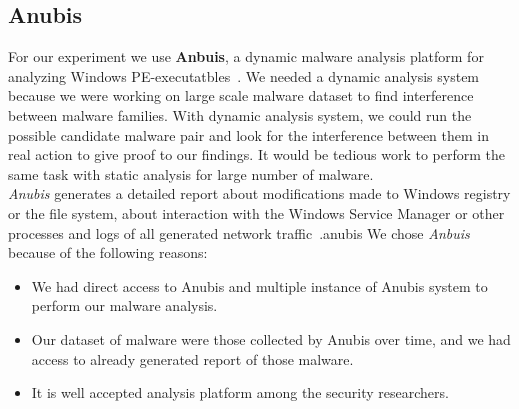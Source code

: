 \subsection{Anubis}
\label{sub:Anubis}
For our experiment we use \textbf{Anbuis}, a dynamic malware analysis platform for analyzing Windows PE-executatbles~\cite[]{anubis}.
We needed a dynamic analysis system because we were working on large scale malware dataset to find interference between malware families.
With dynamic analysis system, we could run the possible candidate malware pair and look for the interference between them in real action to give proof to our findings.
It would be tedious work to perform the same task with static analysis for large number of malware.\\
\emph{Anubis} generates a detailed report about modifications made to Windows registry or the file system, about interaction with the Windows Service Manager or other processes and logs of all generated network traffic~\cite[]{anubis}.anubis
We chose \emph{Anbuis} because of the following reasons:
\begin{itemize}
  \item We had direct access to Anubis and multiple instance of Anubis system to perform our malware analysis.
  \item Our dataset of malware were those collected by Anubis over time, and we had access to already generated report of those malware.
  \item It is well accepted analysis platform among the security researchers.
\end{itemize}

